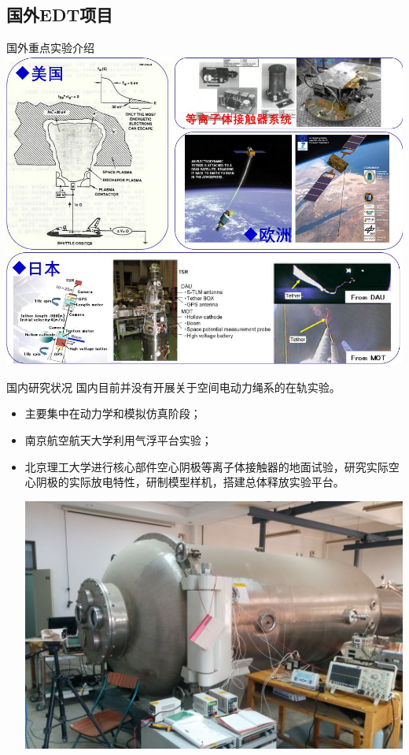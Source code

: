\documentclass[sectioncirclenumberstyle]{le2iutbmbeamer}
\begin{document}
\subsection{国外EDT项目}
\begin{frame}[c]{国外重点实验介绍}
\vspace{-10pt}
\centering
\includegraphics[width=0.9\linewidth]{figures/onlinelab}
\end{frame}
\begin{frame}{国内研究状况}
国内目前并没有开展关于空间电动力绳系的在轨实验。

	\begin{itemize}
		\item 主要集中在动力学和模拟仿真阶段；
		\item 南京航空航天大学利用气浮平台实验；
		
		\item 北京理工大学进行核心部件空心阴极等离子体接触器的地面试验，研究实际空心阴极的实际放电特性，研制模型样机，搭建总体释放实验平台。
		
		\begin{center}
			\includegraphics[width=0.5\linewidth]{figures/dimianshiyan}
		\end{center}  
	\end{itemize}
\end{frame}
\end{document}
